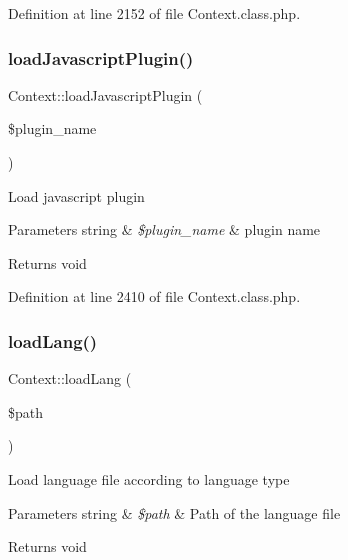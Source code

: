 Definition at line 2152 of file Context.\+class.\+php.

\mbox{\label{classContext_acaea76bdc1334df9c2f088103d619593}} 
\subsubsection{\texorpdfstring{load\+Javascript\+Plugin()}{loadJavascriptPlugin()}}
{\footnotesize\ttfamily Context\+::load\+Javascript\+Plugin (\begin{DoxyParamCaption}\item[{}]{\$plugin\+\_\+name }\end{DoxyParamCaption})}

Load javascript plugin


\begin{DoxyParams}[1]{Parameters}
string & {\em \$plugin\+\_\+name} & plugin name \\
\hline
\end{DoxyParams}
\begin{DoxyReturn}{Returns}
void 
\end{DoxyReturn}


Definition at line 2410 of file Context.\+class.\+php.

\mbox{\label{classContext_a7b22a741ff804e5cdaafd952273bd70c}} 
\subsubsection{\texorpdfstring{load\+Lang()}{loadLang()}}
{\footnotesize\ttfamily Context\+::load\+Lang (\begin{DoxyParamCaption}\item[{}]{\$path }\end{DoxyParamCaption})}

Load language file according to language type


\begin{DoxyParams}[1]{Parameters}
string & {\em \$path} & Path of the language file \\
\hline
\end{DoxyParams}
\begin{DoxyReturn}{Returns}
void 
\end{DoxyReturn}


